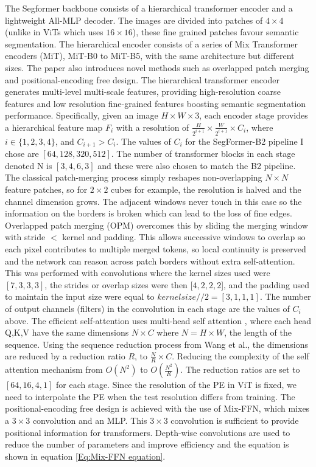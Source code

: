 \documentclass[11pt]{ociamthesis}  %
\begin{document}
The Segformer backbone consists of a hierarchical transformer encoder and a lightweight All-MLP decoder. The images are divided into patches of $4 \times 4$ (unlike in ViTs\cite{dosovitskiy2020image} which uses $16 \times 16$), these fine grained patches favour semantic segmentation. The hierarchical encoder consists of a series of Mix Transformer encoders (MiT), MiT-B0 to MiT-B5, with the same architecture but different sizes. The paper also introduces novel methods such as overlapped patch merging and positional-encoding free design. The hierarchical transformer encoder generates multi-level multi-scale features, providing high-resolution coarse features and low resolution fine-grained features boosting semantic segmentation performance. Specifically, given an image $H \times W \times 3$, each encoder stage provides a hierarchical feature map $F_i$ with a resolution of $\frac{H}{2^{i+1}} \times \frac{W}{2^{i+1}} \times C_i$, where $i \in \{1,2,3,4\}$, and $C_{i+1} > C_i$. The values of $C_i$ for the SegFormer-B2 pipeline I chose are $[64,128,320,512]$. The number of transformer blocks in each stage denoted N is $[3,4,6,3]$ and these were also chosen to match the B2 pipeline. The classical patch-merging process simply reshapes non-overlapping $N \times N$ feature patches, so for $2 \times 2$ cubes for example, the resolution is halved and the channel dimension grows. The adjacent windows never touch in this case so the information on the borders is broken which can lead to the loss of fine edges. Overlapped patch merging (OPM) overcomes this by sliding the merging window with stride $<$ kernel and padding. This allows successive windows to overlap so each pixel contributes to multiple merged tokens, so local continuity is preserved and the network can reason across patch borders without extra self-attention. This was performed with convolutions where the kernel sizes used were $[7,3,3,3]$, the strides or overlap sizes were then [$4,2,2,2$], and the padding used to maintain the input size were equal to $kernel size//2 = [3,1,1,1]$. The number of output channels (filters) in the convolution in each stage are the values of $C_i$ above. The efficient self-attention uses multi-head self attention \cite{dosovitskiy2020image}, where each head Q,K,V have the same dimensions $N \times C$ where $N = H \times W$, the length of the sequence. Using the sequence reduction process from Wang et al.\cite{wang2021pyramid}, the dimensions are reduced by a reduction ratio $R$, to $\frac{N}{R}\times C$. Reducing the complexity of the self attention mechanism from $O(N^2)$ to $O(\frac{N^2}{R})$. The reduction ratios are set to $[64,16,4,1]$ for each stage. Since the resolution of the PE in ViT is fixed, we need to interpolate the PE when the test resolution differs from training. The positional-encoding free design is achieved with the use of Mix-FFN, which mixes a $3 \times 3$ convolution and an MLP. This $3 \times 3$ convolution is sufficient to provide positional information for transformers.  Depth-wise convolutions are used to reduce the number of parameters and improve efficiency and the equation is shown in equation \ref{Eq:Mix-FFN equation}. 
\end{document}

